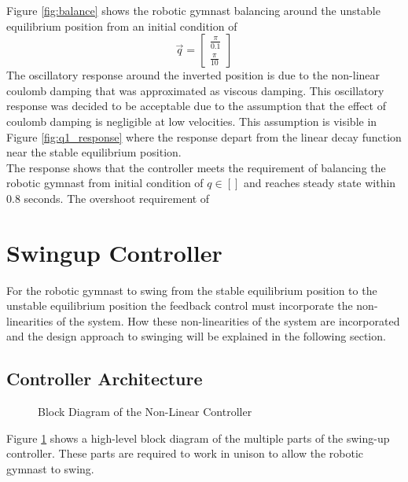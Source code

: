 Figure \ref{fig:balance} shows the robotic gymnast balancing around the unstable equilibrium position from an initial condition of $$ \vec{q} = 
\begin{bmatrix}
\frac{\pi}{0.1}\\
\frac{\pi}{10}
\end{bmatrix}
$$ The oscillatory response around the inverted position is due to the non-linear coulomb damping that was approximated as viscous damping. This oscillatory response was decided to be acceptable due to the assumption that the effect of coulomb damping is negligible at low velocities. This assumption is visible in Figure \ref{fig:q1_response} where the response depart from the linear decay function near the stable equilibrium position.\\

The response shows that the controller meets the requirement of balancing the robotic gymnast from initial condition of $q \in []$ and reaches steady state within 0.8 seconds. The overshoot requirement of 





\section{Swingup Controller}
For the robotic gymnast to swing from the stable equilibrium position to the unstable equilibrium position the feedback control must incorporate the non-linearities of the system. How these non-linearities of the system are incorporated and the design approach to swinging will be explained in the following section.

\subsection{Controller Architecture}
\begin{figure}[h]
	\centering
	
	\caption{Block Diagram of the Non-Linear Controller}
	\label{fig:nonlinear_controller_arch}
\end{figure}

Figure \ref{fig:nonlinear_controller_arch} shows a high-level block diagram of the multiple parts of the swing-up controller. These parts are required to work in unison to allow the robotic gymnast to swing.\\

